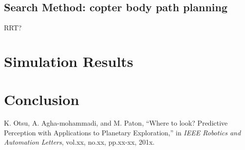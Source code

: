 \documentclass[conference]{IEEEtran}
\begin{document}
\textcolor[gray]{0.5}{
\section{Search Method: copter body path planning}
RRT?
}

\section{Simulation Results}

\section{Conclusion}

\begin{thebibliography}{1}

K. Otsu, A. Agha-mohammadi, and M. Paton, ``Where to look? Predictive Perception with Applications to Planetary Exploration,'' in {\it IEEE Robotics and Automation Letters}, vol.xx, no.xx, pp.xx-xx, 201x.

\end{thebibliography}
\end{document}
